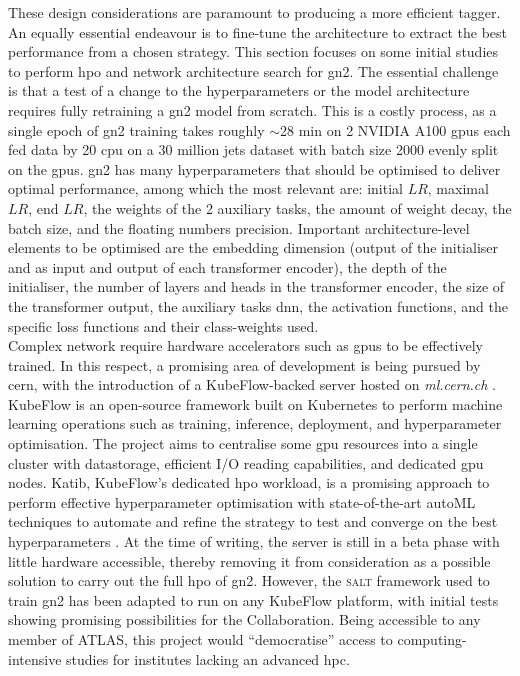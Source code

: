 These design considerations are paramount to producing a more efficient tagger. An equally essential endeavour is to fine-tune the architecture to extract the best performance from a chosen strategy. This section focuses on some initial studies to perform \gls{hpo} and network architecture search for \gls{gn2}. The essential challenge is that a test of a change to the hyperparameters or the model architecture requires fully retraining a \gls{gn2} model from scratch. This is a costly process, as a single epoch of \gls{gn2} training takes roughly $\sim$28 min on 2 NVIDIA A100 \glspl{gpu} each fed data by 20 \gls{cpu} on a 30 million jets dataset with batch size 2000 evenly split on the \glspl{gpu}. \gls{gn2} has many hyperparameters that should be optimised to deliver optimal performance, among which the most relevant are: initial $LR$, maximal $LR$, end $LR$, the weights of the 2 auxiliary tasks, the amount of weight decay, the batch size, and the floating numbers precision. Important architecture-level elements to be optimised are the embedding dimension (output of the initialiser and as input and output of each transformer encoder), the depth of the initialiser, the number of layers and heads in the transformer encoder, the size of the transformer output, the auxiliary tasks \gls{dnn}, the activation functions, and the specific loss functions and their class-weights used. \\

Complex network require hardware accelerators such as \glspl{gpu} to be effectively trained. In this respect, a promising area of development is being pursued by \gls{cern}, with the introduction of a KubeFlow-backed server hosted on \textit{ml.cern.ch} \cite{KubeFlowCern}. KubeFlow is an open-source framework built on Kubernetes to perform machine learning operations such as training, inference, deployment, and hyperparameter optimisation. The project aims to centralise some \gls{gpu} resources into a single cluster with datastorage, efficient I/O reading capabilities, and dedicated \gls{gpu} nodes. Katib, KubeFlow's dedicated \gls{hpo} workload, is a promising approach to perform effective hyperparameter optimisation with state-of-the-art autoML techniques to automate and refine the strategy to test and converge on the best hyperparameters \cite{george2020katib}. At the time of writing, the server is still in a beta phase with little hardware accessible, thereby removing it from consideration as a possible solution to carry out the full \gls{hpo} of \gls{gn2}. However, the \textsc{salt} framework used to train \gls{gn2} has been adapted to run on any KubeFlow platform, with initial tests showing promising possibilities for the Collaboration. Being accessible to any member of ATLAS, this project would ``democratise'' access to computing-intensive studies for institutes lacking an advanced \gls{hpc}. \\

